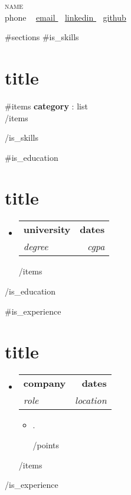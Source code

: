\documentclass[letterpaper,11pt]{article}
\makeatletter
\newcommand{\resumeItem}[1]{
  \item\small{
    {#1 \vspace{-2pt}}
  }
}
\newcommand{\resumeSubheading}[4]{
  \vspace{-2pt}\item
    \begin{tabular*}{1.0\textwidth}[t]{l@{\extracolsep{\fill}}r}
      \textbf{#1} & \textbf{\small #2} \\
      \textit{\small#3} & \textit{\small #4} \\
    \end{tabular*}\vspace{-7pt}
}
\newcommand{\resumeSubHeadingListStart}{\begin{itemize}[leftmargin=0.0in, label={}]}
\newcommand{\resumeSubHeadingListEnd}{\end{itemize}}
\newcommand{\resumeItemListStart}{\begin{itemize}}
\newcommand{\resumeItemListEnd}{\end{itemize}\vspace{-5pt}}
\makeatother
\begin{document}
\begin{center}
    {\Huge \scshape {{{name}}}} \\ \vspace{1pt}
    \small {{{phone}}} ~ \href{mailto:{{{email}}}}{\underline{ {{{email}}} }}  ~
    \href{https://{{{linkedin}}}}{\underline{ {{{linkedin}}} }}  ~
    \href{https://{{{github}}}}{\underline{ {{{github}}} }}
    \vspace{-8pt}
\end{center}

{{#sections}}
{{#is_skills}}
\section{ {{{title}}} }
 \begin{itemize}[leftmargin=0.15in, label={}]
    \small{\item{
     {{#items}}
     \textbf{ {{{category}}} }{: {{{list}}} } \\
     \vspace{2pt}
     {{/items}}
    }}
 \end{itemize}
 \vspace{-16pt}
{{/is_skills}}

{{#is_education}}
\section{ {{{title}}} }
  \resumeSubHeadingListStart
    {{#items}}
    \resumeSubheading
      { {{{university}}} }{ {{{dates}}} }
      { {{{degree}}} }{ {{{cgpa}}} }
      \vspace{-2pt}
    {{/items}}
  \resumeSubHeadingListEnd
  \vspace{-16pt}
{{/is_education}}

{{#is_experience}}
\section{ {{{title}}} }
  \resumeSubHeadingListStart
    {{#items}}
    \resumeSubheading
      { {{{company}}} }{ {{{dates}}} }
      { {{{role}}} }{ {{{location}}} }
      \resumeItemListStart
        {{#points}}
        \resumeItem{ {{{.}}} }
        {{/points}}
      \resumeItemListEnd
    {{/items}}
  \resumeSubHeadingListEnd
\vspace{-16pt}
{{/is_experience}}
\end{document}

